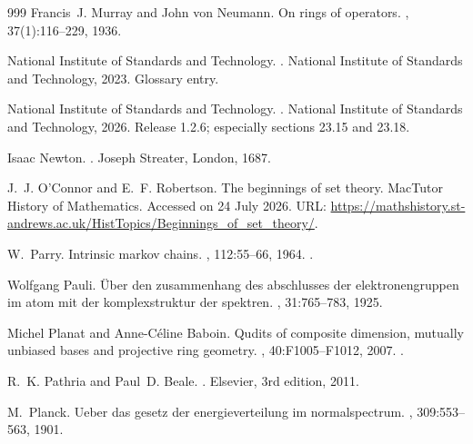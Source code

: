 \begin{thebibliography}{999}
Francis~J. Murray and John von Neumann.
\newblock On rings of operators.
, 37(1):116--229, 1936.

{National Institute of Standards and Technology}.
.
\newblock National Institute of Standards and Technology, 2023.
\newblock Glossary entry.

{National Institute of Standards and Technology}.
.
\newblock National Institute of Standards and Technology, 2026.
\newblock Release 1.2.6; especially sections 23.15 and 23.18.

Isaac Newton.
.
\newblock Joseph Streater, London, 1687.

J.~J. O'Connor and E.~F. Robertson.
\newblock The beginnings of set theory.
\newblock MacTutor History of Mathematics.
\newblock Accessed on 24 July 2026.
\newblock URL:
  \url{https://mathshistory.st-andrews.ac.uk/HistTopics/Beginnings_of_set_theory/}.

W.~Parry.
\newblock Intrinsic markov chains.
, 112:55--66,
  1964.
\newblock \href {https://doi.org/10.1090/S0002-9947-1964-0161372-1}
  {}.

 Wolfgang Pauli.
\newblock Über den zusammenhang des abschlusses der elektronengruppen im atom
  mit der komplexstruktur der spektren.
, 31:765--783, 1925.

Michel Planat and Anne-C{\'e}line Baboin.
\newblock Qudits of composite dimension, mutually unbiased bases and projective
  ring geometry.
,
  40:F1005--F1012, 2007.
\newblock \href {https://arxiv.org/abs/0709.2623} {}.

R.~K. Pathria and Paul~D. Beale.
.
\newblock Elsevier, 3rd edition, 2011.

M.~Planck.
\newblock Ueber das gesetz der energieverteilung im normalspectrum.
, 309:553--563, 1901.


\end{thebibliography}
